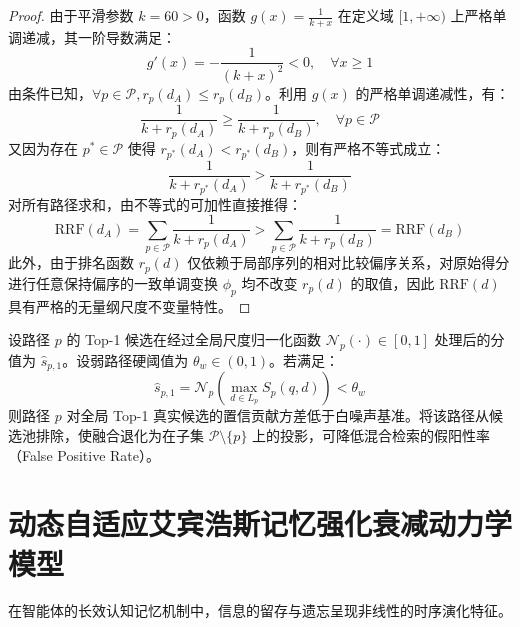 \begin{proof}
    由于平滑参数 $k = 60 > 0$，函数 $g(x) = \frac{1}{k + x}$ 在定义域 $[1, +\infty)$ 上严格单调递减，其一阶导数满足：
    \begin{equation}
        g'(x) = -\frac{1}{(k + x)^2} < 0, \quad \forall x \ge 1
    \end{equation}
    由条件已知，$\forall p \in \mathcal{P}, r_p(d_A) \le r_p(d_B)$。利用 $g(x)$ 的严格单调递减性，有：
    \begin{equation}
        \frac{1}{k + r_p(d_A)} \ge \frac{1}{k + r_p(d_B)}, \quad \forall p \in \mathcal{P}
    \end{equation}
    又因为存在 $p^* \in \mathcal{P}$ 使得 $r_{p^*}(d_A) < r_{p^*}(d_B)$，则有严格不等式成立：
    \begin{equation}
        \frac{1}{k + r_{p^*}(d_A)} > \frac{1}{k + r_{p^*}(d_B)}
    \end{equation}
    对所有路径求和，由不等式的可加性直接推得：
    \begin{equation}
        \text{RRF}(d_A) = \sum_{p \in \mathcal{P}} \frac{1}{k + r_p(d_A)} > \sum_{p \in \mathcal{P}} \frac{1}{k + r_p(d_B)} = \text{RRF}(d_B)
    \end{equation}
    此外，由于排名函数 $r_p(d)$ 仅依赖于局部序列的相对比较偏序关系，对原始得分进行任意保持偏序的一致单调变换 $\phi_p$ 均不改变 $r_p(d)$ 的取值，因此 $\text{RRF}(d)$ 具有严格的无量纲尺度不变量特性。
\end{proof}

\begin{lemma}[动态弱路径剪枝判决下界]
    \label{lem:weak_path}
    设路径 $p$ 的 Top-1 候选在经过全局尺度归一化函数 $\mathcal{N}_p(\cdot) \in [0, 1]$ 处理后的分值为 $\hat{s}_{p,1}$。设弱路径硬阈值为 $\theta_w \in (0, 1)$。若满足：
    \begin{equation}
        \hat{s}_{p,1} = \mathcal{N}_p\left(\max_{d \in L_p} S_p(q, d)\right) < \theta_w
    \end{equation}
    则路径 $p$ 对全局 Top-1 真实候选的置信贡献方差低于白噪声基准。将该路径从候选池排除，使融合退化为在子集 $\mathcal{P} \setminus \{p\}$ 上的投影，可降低混合检索的假阳性率（False Positive Rate）。
\end{lemma}

\section{动态自适应艾宾浩斯记忆强化衰减动力学模型}

在智能体的长效认知记忆机制中，信息的留存与遗忘呈现非线性的时序演化特征。

